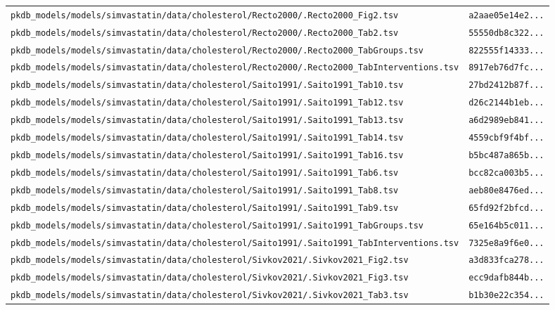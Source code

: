 \begin{longtable}{ll}
\texttt{pkdb\_models/models/simvastatin/data/cholesterol/Recto2000/.Recto2000\_Fig2.tsv} & \texttt{a2aae05e14e2...} \\
\texttt{pkdb\_models/models/simvastatin/data/cholesterol/Recto2000/.Recto2000\_Tab2.tsv} & \texttt{55550db8c322...} \\
\texttt{pkdb\_models/models/simvastatin/data/cholesterol/Recto2000/.Recto2000\_TabGroups.tsv} & \texttt{822555f14333...} \\
\texttt{pkdb\_models/models/simvastatin/data/cholesterol/Recto2000/.Recto2000\_TabInterventions.tsv} & \texttt{8917eb76d7fc...} \\
\texttt{pkdb\_models/models/simvastatin/data/cholesterol/Saito1991/.Saito1991\_Tab10.tsv} & \texttt{27bd2412b87f...} \\
\texttt{pkdb\_models/models/simvastatin/data/cholesterol/Saito1991/.Saito1991\_Tab12.tsv} & \texttt{d26c2144b1eb...} \\
\texttt{pkdb\_models/models/simvastatin/data/cholesterol/Saito1991/.Saito1991\_Tab13.tsv} & \texttt{a6d2989eb841...} \\
\texttt{pkdb\_models/models/simvastatin/data/cholesterol/Saito1991/.Saito1991\_Tab14.tsv} & \texttt{4559cbf9f4bf...} \\
\texttt{pkdb\_models/models/simvastatin/data/cholesterol/Saito1991/.Saito1991\_Tab16.tsv} & \texttt{b5bc487a865b...} \\
\texttt{pkdb\_models/models/simvastatin/data/cholesterol/Saito1991/.Saito1991\_Tab6.tsv} & \texttt{bcc82ca003b5...} \\
\texttt{pkdb\_models/models/simvastatin/data/cholesterol/Saito1991/.Saito1991\_Tab8.tsv} & \texttt{aeb80e8476ed...} \\
\texttt{pkdb\_models/models/simvastatin/data/cholesterol/Saito1991/.Saito1991\_Tab9.tsv} & \texttt{65fd92f2bfcd...} \\
\texttt{pkdb\_models/models/simvastatin/data/cholesterol/Saito1991/.Saito1991\_TabGroups.tsv} & \texttt{65e164b5c011...} \\
\texttt{pkdb\_models/models/simvastatin/data/cholesterol/Saito1991/.Saito1991\_TabInterventions.tsv} & \texttt{7325e8a9f6e0...} \\
\texttt{pkdb\_models/models/simvastatin/data/cholesterol/Sivkov2021/.Sivkov2021\_Fig2.tsv} & \texttt{a3d833fca278...} \\
\texttt{pkdb\_models/models/simvastatin/data/cholesterol/Sivkov2021/.Sivkov2021\_Fig3.tsv} & \texttt{ecc9dafb844b...} \\
\texttt{pkdb\_models/models/simvastatin/data/cholesterol/Sivkov2021/.Sivkov2021\_Tab3.tsv} & \texttt{b1b30e22c354...} \\

\end{longtable}
